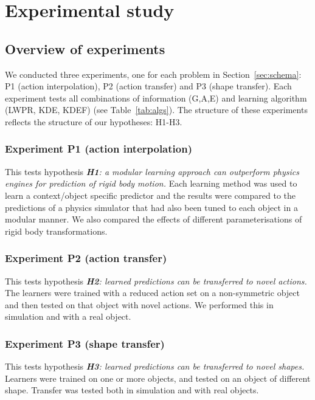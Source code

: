 
\newlength{\barchartwidth}
\setlength{\barchartwidth}{6.5cm}

\section{Experimental study}\label{sec:Experiment}

\subsection{Overview of experiments}\label{sec:Experiment.Overview}

We conducted three experiments, one for each problem in Section~\ref{sec:schema}: P1 (action interpolation), P2 (action transfer) and P3
(shape transfer). Each experiment tests all combinations of information (G,A,E) and learning algorithm (LWPR, KDE, KDEF) (see Table~\ref{tab:algs}). The structure of these experiments reflects the structure of our hypotheses: H1-H3.

\subsubsection{Experiment P1 (action interpolation)} This tests hypothesis {\em {\bf H1}: a modular learning approach can outperform physics engines for prediction of rigid body motion.} Each learning method was used to learn a context/object specific predictor and the results were compared to the predictions of a physics simulator that had also been tuned to each object in a modular manner. We also compared the effects of different parameterisations of rigid body transformations.

\subsubsection{Experiment P2 (action transfer)} This tests hypothesis {\em {\bf H2}: learned predictions can be transferred to novel actions.} The learners were trained with a reduced action set on a non-symmetric object and then tested on that object with novel actions. We performed this in simulation and with a real object.

\subsubsection{Experiment P3 (shape transfer)} This tests hypothesis {\em {\bf H3}: learned predictions can be transferred to novel shapes.} Learners were trained on one or more objects, and tested on an object of different shape. Transfer was tested both in simulation and with real objects.


